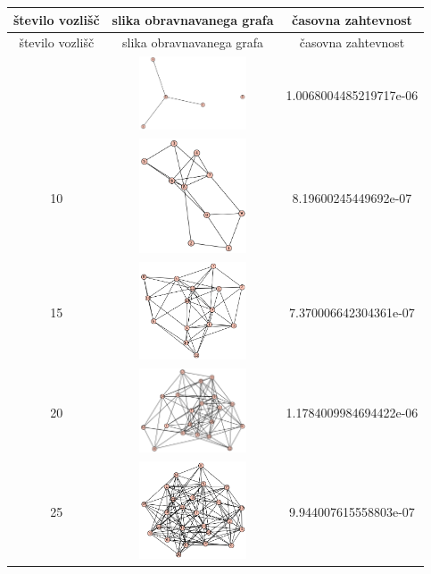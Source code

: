 \documentclass[a4paper, 12pt]{article}
\begin{document}
\begin{center}
    \begin{longtable}{c|c|c}
        število vozlišč & slika obravnavanega grafa & časovna zahtevnost \\ \hline
        \endfirsthead \hline
        število vozlišč & slika obravnavanega grafa & časovna zahtevnost \\
        \endhead \endfoot \endlastfoot
        5 & \includegraphics[width=90pt]{D1} & 1.0068004485219717e-06 \\ \hline
        10 & \includegraphics[width=90pt]{D2} & 8.19600245449692e-07 \\ \hline
        15 & \includegraphics[width=90pt]{D3} & 7.370006642304361e-07 \\ \hline
        20 & \includegraphics[width=90pt]{D4} & 1.1784009984694422e-06 \\ \hline
        25 & \includegraphics[width=90pt]{D5} & 9.944007615558803e-07 \\ \hline

\end{longtable}
\end{center}
\end{document}
